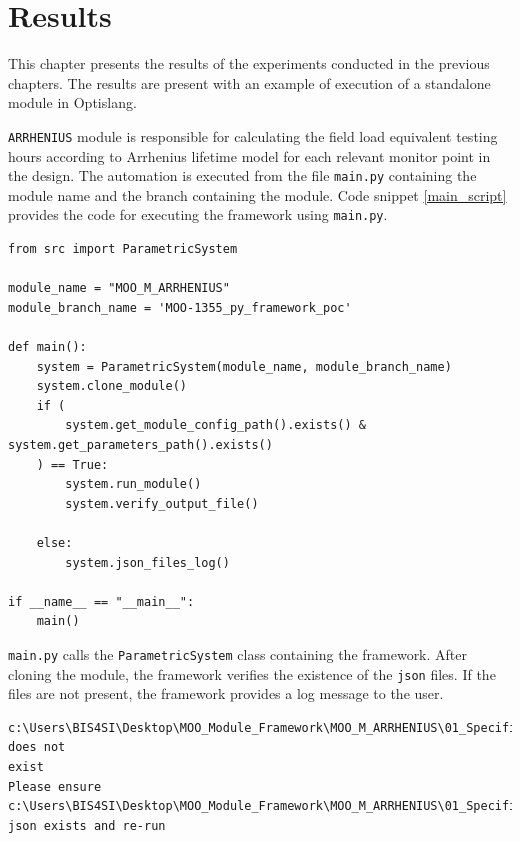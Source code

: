 \chapter{Results} \label{results}

This chapter presents the results of the experiments conducted in the previous chapters. The results are present with an example of execution of a standalone 
module in Optislang.  

\texttt{ARRHENIUS} module is responsible for calculating the field load equivalent testing hours according to Arrhenius lifetime model for each relevant monitor point
in the design. The automation is executed from the file \texttt{main.py} containing the module name and the branch containing the module. 
Code snippet \ref{main_script} provides the code for executing the framework using \texttt{main.py}.

\renewcommand{\lstlistingname}{Code}
\begin{lstlisting}[style=pythoncode, caption={Execution of framework using \texttt{main.py}}, label={main_script}]
from src import ParametricSystem

module_name = "MOO_M_ARRHENIUS"
module_branch_name = 'MOO-1355_py_framework_poc'

def main():
    system = ParametricSystem(module_name, module_branch_name)
    system.clone_module()
    if (
        system.get_module_config_path().exists() & system.get_parameters_path().exists()
    ) == True:
        system.run_module()
        system.verify_output_file()

    else:
        system.json_files_log()

if __name__ == "__main__":
    main()
\end{lstlisting}

\texttt{main.py} calls the \texttt{ParametricSystem} class containing the framework. After cloning the module, the framework verifies the existence of the 
\texttt{\acrshort{json}} files. If the files are not present, the framework provides a log message to the user.

\renewcommand{\lstlistingname}{Code}
\begin{lstlisting}[style=terminal, caption=Error message when \acrshort{json} files are not present, label={json_files_log}]
c:\Users\BIS4SI\Desktop\MOO_Module_Framework\MOO_M_ARRHENIUS\01_Specification\module_config.json does not 
exist 
Please ensure c:\Users\BIS4SI\Desktop\MOO_Module_Framework\MOO_M_ARRHENIUS\01_Specification\module_config.
json exists and re-run
\end{lstlisting}

